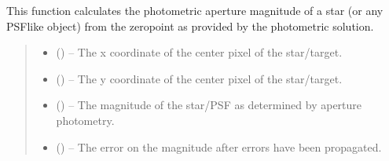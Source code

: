 \documentclass[letterpaper,11pt,english]{sphinxmanual}
\begin{document}
\begin{savenotes}
\begin{fulllineitems}
\begin{savenotes}\begin{fulllineitems}
\label{\detokenize{code/opihiexarata.photometry.solution:opihiexarata.photometry.solution.PhotometricSolution.calculate_star_aperture_magnitude}}
\pysigstartsignatures
{}
\pysigstopsignatures
\sphinxAtStartPar
This function calculates the photometric aperture magnitude of a
star (or any PSF\sphinxhyphen{}like object) from the zero\sphinxhyphen{}point as provided by the
photometric solution.
\begin{quote}\begin{description}
\begin{itemize}
\item {} 
\sphinxAtStartPar
{} () – The x coordinate of the center pixel of the star/target.

\item {} 
\sphinxAtStartPar
{} () – The y coordinate of the center pixel of the star/target.

\end{itemize}

\sphinxAtStartPar
\begin{itemize}
\item {} 
\sphinxAtStartPar
{} () – The magnitude of the star/PSF as determined by aperture photometry.

\item {} 
\sphinxAtStartPar
{} () – The error on the magnitude after errors have been propagated.

\end{itemize}


\end{description}\end{quote}

\end{fulllineitems}\end{savenotes}


\end{fulllineitems}
\end{savenotes}
\end{document}
